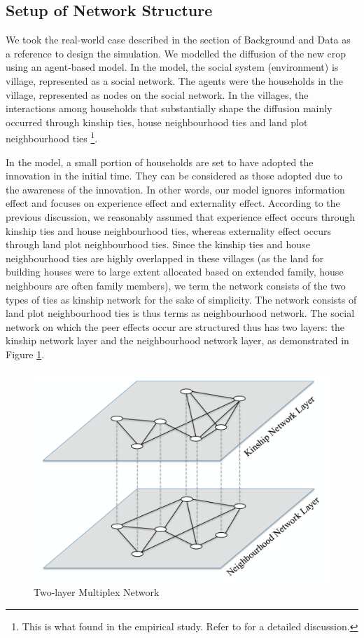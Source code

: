 \documentclass{bmcart}
\renewcommand{\figurename}{Figure }
\begin{document}
\subsection*{Setup of Network Structure}
\label{simulate multiplex network}
We took the real-world case described in the section of Background and Data as a reference to design the simulation. We modelled the diffusion of the new crop using an agent-based model. In the model, the social system (environment) is village, represented as a social network. The agents were the households in the village, represented as nodes on the social network. In the villages, the interactions among households that substantially shape the diffusion mainly occurred through kinship ties, house neighbourhood ties and land plot neighbourhood ties \footnote{This is what found in the empirical study. Refer to \cite{Xiong2017} for a detailed discussion.}. 

In the model, a small portion of households are set to have adopted the innovation in the initial time. They can be considered as those adopted due to the awareness of the innovation. In other words, our model ignores information effect and focuses on experience effect and externality effect. According to the previous discussion, we reasonably assumed that experience effect occurs through kinship ties and house neighbourhood ties, whereas externality effect occurs through land plot neighbourhood ties. Since the kinship ties and house neighbourhood ties are highly overlapped in these villages (as the land for building houses were to large extent allocated based on extended family, house neighbours are often family members), we term the network consists of the two types of ties as kinship network for the sake of simplicity. The network consists of land plot neighbourhood ties is thus terms as neighbourhood network. The social network on which the peer effects occur are structured thus has two layers: the kinship network layer and the neighbourhood network layer, as demonstrated in \figurename \ref{Fig: two-layer network}. 

\begin{center}
\begin{figure}[ht!]
\centering
\includegraphics[scale=0.25]{two-layer_network.jpg}
\caption{Two-layer Multiplex Network}
\label{Fig: two-layer network}
\end{figure}
\end{center}
\end{document}
